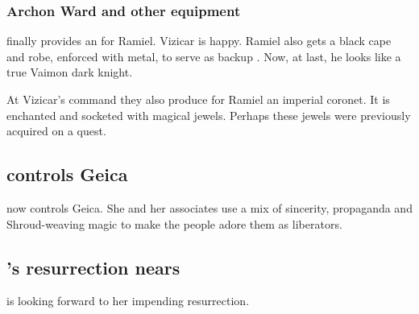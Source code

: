 \subsubsection{Archon Ward and other equipment}
\Belzir{} finally provides an  for Ramiel. Vizicar is happy. Ramiel also gets a black cape and robe, enforced with metal, to serve as backup \armour. Now, at last, he looks like a true Vaimon dark knight. 

At Vizicar's command they also produce for Ramiel an imperial coronet. It is enchanted and socketed with magical jewels. Perhaps these jewels were previously acquired on a quest.







\subsection{\Belzir controls Geica}
\Belzir{} now controls Geica. She and her associates use a mix of sincerity, propaganda and Shroud-weaving magic to make the people adore them as liberators. 









\subsection{\Belzir's resurrection nears}
\Belzir{} is looking forward to her impending resurrection. 


